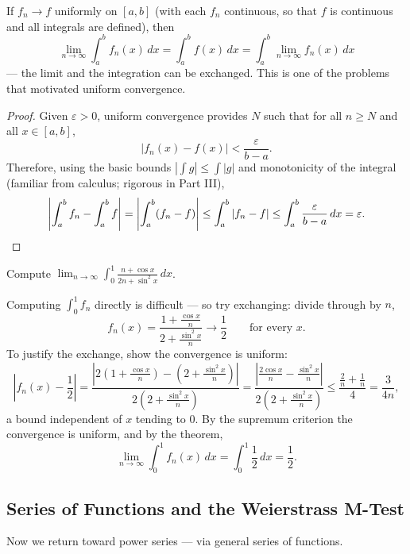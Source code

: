 \documentclass[11pt]{report}
\begin{document}
\begin{thmbox}
If $f_n \to f$ uniformly on $[a,b]$ (with each $f_n$ continuous, so that $f$ is continuous and all integrals are defined), then
\[
\lim_{n\to\infty} \int_a^b f_n(x)\,dx = \int_a^b f(x)\,dx = \int_a^b \lim_{n\to\infty} f_n(x)\,dx
\]
--- the limit and the integration can be exchanged. This is one of the problems that motivated uniform convergence.
\end{thmbox}

\begin{proof}
Given $\varepsilon > 0$, uniform convergence provides $N$ such that for all $n \geq N$ and all $x \in [a,b]$,
\[
|f_n(x) - f(x)| < \frac{\varepsilon}{b-a}.
\]
Therefore, using the basic bounds $\left|\int g\right| \leq \int |g|$ and monotonicity of the integral (familiar from calculus; rigorous in Part III),
\[
\left| \int_a^b f_n - \int_a^b f \right| = \left| \int_a^b (f_n - f) \right| \leq \int_a^b |f_n - f| \leq \int_a^b \frac{\varepsilon}{b-a}\,dx = \varepsilon. \qedhere
\]
\end{proof}

\begin{exbox}
Compute $\displaystyle\lim_{n\to\infty} \int_0^1 \frac{n + \cos x}{2n + \sin^2 x}\,dx$.

Computing $\int_0^1 f_n$ directly is difficult --- so try exchanging: divide through by $n$,
\[
f_n(x) = \frac{1 + \tfrac{\cos x}{n}}{2 + \tfrac{\sin^2 x}{n}} \longrightarrow \frac12 \qquad \text{for every } x.
\]
To justify the exchange, show the convergence is uniform:
\[
\left| f_n(x) - \frac12 \right|
= \frac{\left| 2\left(1 + \tfrac{\cos x}{n}\right) - \left(2 + \tfrac{\sin^2 x}{n}\right) \right|}{2\left(2 + \tfrac{\sin^2 x}{n}\right)}
= \frac{\left| \tfrac{2\cos x}{n} - \tfrac{\sin^2 x}{n} \right|}{2\left(2 + \tfrac{\sin^2 x}{n}\right)}
\leq \frac{\tfrac2n + \tfrac1n}{4} = \frac{3}{4n},
\]
a bound independent of $x$ tending to $0$. By the supremum criterion the convergence is uniform, and by the theorem,
\[
\lim_{n\to\infty} \int_0^1 f_n(x)\,dx = \int_0^1 \frac12\,dx = \frac12. \tag*{$\blacksquare$}
\]
\end{exbox}

\subsection{Series of Functions and the Weierstrass M-Test}

Now we return toward power series --- via general series of functions.
\end{document}
